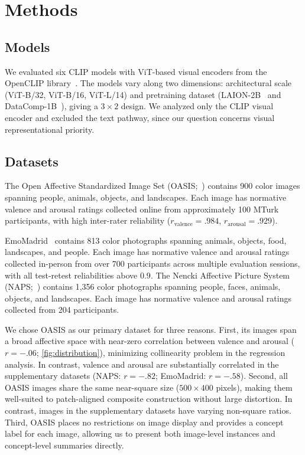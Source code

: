 \documentclass{article}
\begin{document}
\section{Methods}

\subsection{Models}

We evaluated six CLIP models with ViT-based visual encoders from the OpenCLIP
library~\citep{cherti2023reproducible, ilharco_gabriel_openclip_repo}.
The models vary along two dimensions: architectural scale (ViT-B/32, ViT-B/16, ViT-L/14) and pretraining dataset 
(LAION-2B~\citep{schuhmann2022laion5bopenlargescaledataset}
and DataComp-1B~\citep{gadre2023datacompsearchgenerationmultimodal}), 
giving a $3 \times 2$ design. 
We analyzed only the CLIP visual encoder and excluded the text pathway, since our question concerns visual representational priority.


\subsection{Datasets}
The Open Affective Standardized Image Set
(OASIS;~\citep{kurdiIntroducingOpenAffective2017}) contains 900 color images
spanning people, animals, objects, and landscapes. Each image has normative
valence and arousal ratings collected online from approximately 100 MTurk
participants, with high inter-rater reliability
($r_\text{valence} = .984$, $r_\text{arousal} = .929$). 

EmoMadrid~\citep{carretieEmoMadridEmotionalPictures2019} contains 813
color photographs spanning animals, objects, food, landscapes, and people.
Each image has normative valence and arousal ratings collected in-person from over 700
participants across multiple evaluation sessions, with all test-retest
reliabilities above $0.9$.
The Nencki Affective Picture System
(NAPS;~\citealt{marchewkaNAPSIntroduction2014}) contains 1,356 color
photographs spanning people, faces, animals, objects, and landscapes. Each image has
normative valence and arousal ratings collected from 204 participants.

We chose OASIS as our primary dataset for three reasons. 
First, its images span a broad affective space with near-zero correlation between valence and arousal ($r = -.06$; \cref{fig:distribution}), minimizing collinearity problem in the
regression analysis. 
In contrast, valence and arousal are substantially
correlated in the supplementary datasets (NAPS: $r = -.82$; EmoMadrid:
$r = -.58$). 
Second, all OASIS images share the same near-square size
($500 \times 400$ pixels), making them well-suited to patch-aligned composite construction without large distortion. 
In contrast, images in the supplementary datasets have varying non-square ratios. 
Third, OASIS places no restrictions on image display and provides a concept label for each image, allowing us to present both image-level instances and concept-level summaries directly.
\end{document}
